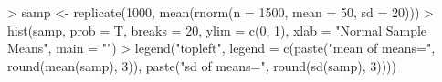 \begin{Schunk}
\begin{Sinput}
> samp <- replicate(1000, mean(rnorm(n = 1500, mean = 50, 
      sd = 20)))
> hist(samp, prob = T, breaks = 20, ylim = c(0, 
      1), xlab = "Normal Sample Means", main = "")
> legend("topleft", legend = c(paste("mean of means=", 
      round(mean(samp), 3)), paste("sd of means=", 
      round(sd(samp), 3))))
\end{Sinput}
\end{Schunk}
